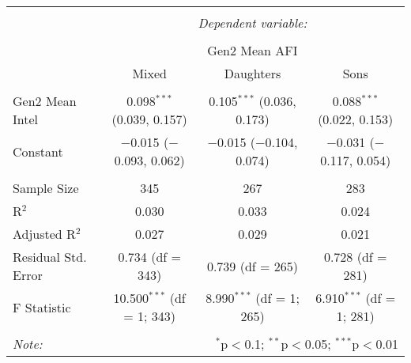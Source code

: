 
\begingroup 
\small 
\begin{tabular}{@{\extracolsep{1pt}}lccc} 
\\[-1.8ex]\hline 
\hline \\[-1.8ex] 
 & \multicolumn{3}{c}{\textit{Dependent variable:}} \\ 
\cline{2-4} 
\\[-1.8ex] & \multicolumn{3}{c}{Gen2 Mean AFI} \\ 
 & Mixed & Daughters & Sons \\ 
\hline \\[-1.8ex] 
 Gen2 Mean Intel & 0.098$^{***}$ (0.039, 0.157) & 0.105$^{***}$ (0.036, 0.173) & 0.088$^{***}$ (0.022, 0.153) \\ 
  Constant & $-$0.015 ($-$0.093, 0.062) & $-$0.015 ($-$0.104, 0.074) & $-$0.031 ($-$0.117, 0.054) \\ 
 \hline \\[-1.8ex] 
Sample Size & 345 & 267 & 283 \\ 
R$^{2}$ & 0.030 & 0.033 & 0.024 \\ 
Adjusted R$^{2}$ & 0.027 & 0.029 & 0.021 \\ 
Residual Std. Error & 0.734 (df = 343) & 0.739 (df = 265) & 0.728 (df = 281) \\ 
F Statistic & 10.500$^{***}$ (df = 1; 343) & 8.990$^{***}$ (df = 1; 265) & 6.910$^{***}$ (df = 1; 281) \\ 
\hline 
\hline \\[-1.8ex] 
\textit{Note:}  & \multicolumn{3}{r}{$^{*}$p$<$0.1; $^{**}$p$<$0.05; $^{***}$p$<$0.01} \\ 
\end{tabular} 
\endgroup 
